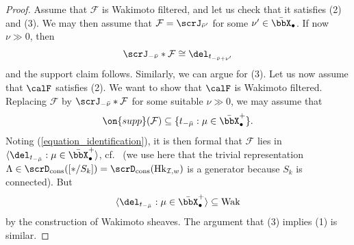 \documentclass[10pt, reqno]{amsart}
\theoremstyle{plain}
\theoremstyle{definition}
\numberwithin{equation}{section}
\begin{document}
	\begin{proof}
		Assume that $\mathcal{F}$ is Wakimoto filtered, and let us check that it satisfies (2) and (3). We may then assume that $\mathcal{F}=\scrJ_{\bar\nu^\prime}$ for some $\nu^\prime\in \bar\bbX_\bullet$. If now $\nu\gg 0$, then
		\begin{equation}
			\scrJ_{-\bar\nu}\ast \mathcal{F}\cong \del_{t_{-\bar\nu+\nu^\prime}}
		\end{equation}
		and the support claim follows. Similarly, we can argue for (3).
		Let us now assume that $\calF$ satisfies (2). We want to show that $\calF$ is Wakimoto filtered. Replacing $\mathcal{F}$ by $\scrJ_{-\bar\nu}\ast \mathcal{F}$ for some suitable $\nu\gg 0$, we may assume that
		\begin{equation}
			\on{supp}(\mathcal{F})\subseteq \{t_{-\bar\mu} : \mu\in \bar\bbX_\bullet^+\}.
		\end{equation}
		Noting (\ref{equation_identification}), it is then formal that $\mathcal{F}$ lies in $\langle \del_{t_{-\bar\mu}} : \mu\in \bar\bbX_\bullet^+\rangle$, cf.\ \cite[Lemma 4.4.3]{AR} (we use here that the trivial representation $\Lambda\in \scrD_{\mathrm{cons}}([\ast/S_k])=\scrD_{\mathrm{cons}}(\mathrm{Hk}_{\mathcal{I},w})$ is a generator because $S_k$ is connected). But
		\begin{equation}
			\langle \del_{t_{-\bar\mu}} : \mu\in \bar\bbX_\bullet^+\rangle\subseteq \rm{Wak}
		\end{equation}
		by the construction of Wakimoto sheaves. The argument that (3) implies (1) is similar.
		

\end{proof}
\end{document}
